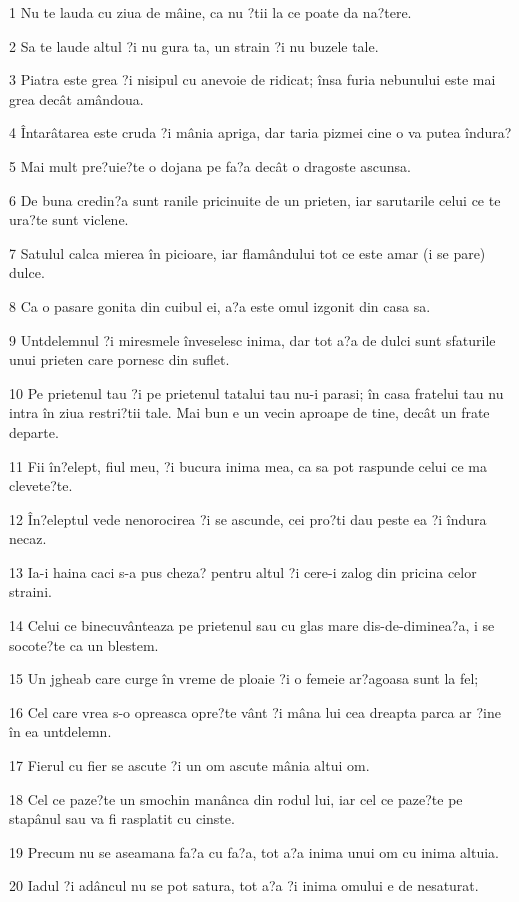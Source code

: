 \par 1 Nu te lauda cu ziua de mâine, ca nu ?tii la ce poate da na?tere.
\par 2 Sa te laude altul ?i nu gura ta, un strain ?i nu buzele tale.
\par 3 Piatra este grea ?i nisipul cu anevoie de ridicat; însa furia nebunului este mai grea decât amândoua.
\par 4 Întarâtarea este cruda ?i mânia apriga, dar taria pizmei cine o va putea îndura?
\par 5 Mai mult pre?uie?te o dojana pe fa?a decât o dragoste ascunsa.
\par 6 De buna credin?a sunt ranile pricinuite de un prieten, iar sarutarile celui ce te ura?te sunt viclene.
\par 7 Satulul calca mierea în picioare, iar flamândului tot ce este amar (i se pare) dulce.
\par 8 Ca o pasare gonita din cuibul ei, a?a este omul izgonit din casa sa.
\par 9 Untdelemnul ?i miresmele înveselesc inima, dar tot a?a de dulci sunt sfaturile unui prieten care pornesc din suflet.
\par 10 Pe prietenul tau ?i pe prietenul tatalui tau nu-i parasi; în casa fratelui tau nu intra în ziua restri?tii tale. Mai bun e un vecin aproape de tine, decât un frate departe.
\par 11 Fii în?elept, fiul meu, ?i bucura inima mea, ca sa pot raspunde celui ce ma clevete?te.
\par 12 În?eleptul vede nenorocirea ?i se ascunde, cei pro?ti dau peste ea ?i îndura necaz.
\par 13 Ia-i haina caci s-a pus cheza? pentru altul ?i cere-i zalog din pricina celor straini.
\par 14 Celui ce binecuvânteaza pe prietenul sau cu glas mare dis-de-diminea?a, i se socote?te ca un blestem.
\par 15 Un jgheab care curge în vreme de ploaie ?i o femeie ar?agoasa sunt la fel;
\par 16 Cel care vrea s-o opreasca opre?te vânt ?i mâna lui cea dreapta parca ar ?ine în ea untdelemn.
\par 17 Fierul cu fier se ascute ?i un om ascute mânia altui om.
\par 18 Cel ce paze?te un smochin manânca din rodul lui, iar cel ce paze?te pe stapânul sau va fi rasplatit cu cinste.
\par 19 Precum nu se aseamana fa?a cu fa?a, tot a?a inima unui om cu inima altuia.
\par 20 Iadul ?i adâncul nu se pot satura, tot a?a ?i inima omului e de nesaturat.
